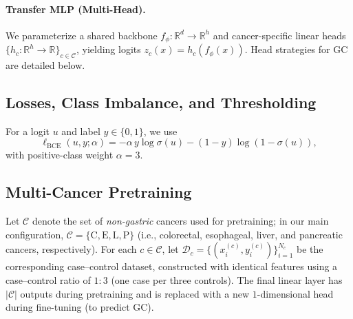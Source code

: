 \documentclass[journal,article,submit,pdftex,moreauthors]{Definitions/mdpi}
\begin{document}
\paragraph{Transfer MLP (Multi-Head).}
We parameterize a shared backbone $f_\phi:\mathbb{R}^d\!\to\!\mathbb{R}^h$ and cancer-specific linear heads $\{h_c:\mathbb{R}^h\!\to\!\mathbb{R}\}_{c\in\mathcal{C}}$, yielding logits $z_c(x)=h_c(f_\phi(x))$. Head strategies for GC are detailed below.

\subsection{Losses, Class Imbalance, and Thresholding}
For a logit $u$ and label $y\in\{0,1\}$, we use
\begin{equation}
\ell_{\mathrm{BCE}}(u,y;\alpha)=-\alpha\,y\log\sigma(u)-(1-y)\log(1-\sigma(u)),
\end{equation}
with positive-class weight $\alpha{=}3$.

\subsection{Multi-Cancer Pretraining}\label{sec:pretrain_multi}
Let $\mathcal{C}$ denote the set of \emph{non-gastric} cancers used for pretraining; in our main configuration, $\mathcal{C}=\{\mathrm{C},\mathrm{E},\mathrm{L},\mathrm{P}\}$ (i.e., colorectal, esophageal, liver, and pancreatic cancers, respectively).
For each $c\in\mathcal{C}$, let $\mathcal{D}_c=\{(x_i^{(c)},y_i^{(c)})\}_{i=1}^{N_c}$ be the corresponding case--control dataset, constructed with identical features using a case--control ratio of $1{:}3$ (one case per three controls).
The final linear layer has $|\mathcal{C}|$ outputs during pretraining and is replaced with a new $1$-dimensional head during fine-tuning (to predict GC).
\end{document}
